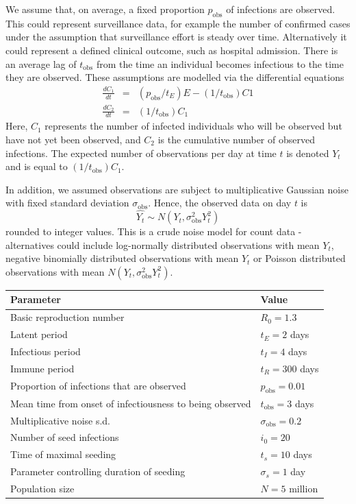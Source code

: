 \documentclass[12pt]{article}
\begin{document}
We assume that, on average, a fixed proportion $p_\mathrm{obs}$ of infections are observed. This could represent surveillance data, for example the number of confirmed cases under the assumption that surveillance effort is steady over time. Alternatively it could represent a defined clinical outcome, such as hospital admission. There is an average lag of $t_\mathrm{obs}$ from the time an individual becomes infectious to the time they are observed. These assumptions are modelled via the differential equations
\begin{eqnarray}
    \frac{dC_1}{dt} &=& (p_\mathrm{obs}/t_E) E - (1/t_\mathrm{obs}) C1 \\
    \frac{dC_2}{dt} &=& (1/t_\mathrm{obs}) C_1
\end{eqnarray}
Here, $C_1$ represents the number of infected individuals who will be observed but have not yet been observed, and $C_2$ is the cumulative number of observed infections. The expected number of observations per day at time $t$ is denoted $Y_t$ and is equal to $(1/t_\mathrm{obs}) C_1$.

In addition, we assumed observations are subject to multiplicative Gaussian noise with fixed standard deviation $\sigma_\mathrm{obs}$. Hence, the observed data on day $t$ is
\[
\hat{Y_t} \sim N(Y_t, \sigma_\mathrm{obs}^2 Y_t^2)
\]
rounded to integer values. This is a crude noise model for count data - alternatives could include log-normally distributed observations with mean $Y_t$, negative binomially distributed observations with mean $Y_t$ or Poisson distributed observations with mean $N(Y_t, \sigma_\mathrm{obs}^2 Y_t^2)$.



\begin{table}
\begin{tabular}{ll}
\hline
Parameter & Value \\
\hline
Basic reproduction number  & $R_0=1.3$ \\
Latent period & $t_E=2$ days \\
Infectious period & $t_I=4$ days \\
Immune period & $t_R=300$ days \\
Proportion of infections that are observed & $p_\mathrm{obs}=0.01$ \\
Mean time from onset of infectiousness to being observed & $t_\mathrm{obs}=3$ days \\
Multiplicative noise s.d. & $\sigma_\mathrm{obs}=0.2$ \\
Number of seed infections & $i_0=20$ \\
Time of maximal seeding & $t_s=10$ days \\
Parameter controlling duration of seeding & $\sigma_s=1$ day \\
Population size & $N=5$ million \\
\hline
\end{tabular}
\end{table}
\end{document}
